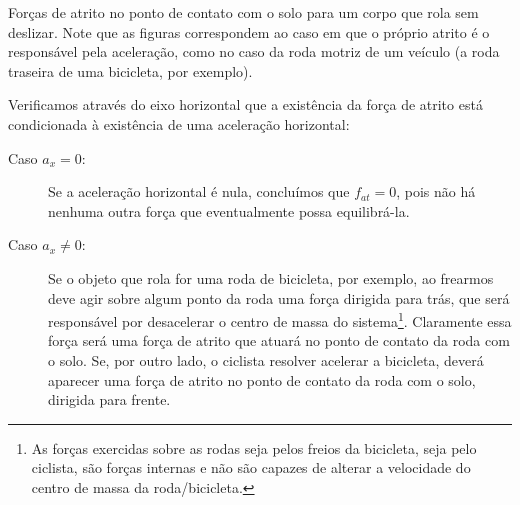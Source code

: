 \begin{marginfigure}[-3cm]
\caption{Forças de atrito no ponto de contato com o solo para um corpo que rola sem deslizar. Note que as figuras correspondem ao caso em que o próprio atrito é o responsável pela aceleração, como no caso da roda motriz de um veículo (a roda traseira de uma bicicleta, por exemplo).}
\end{marginfigure}

Verificamos através do eixo horizontal que a existência da força de atrito está condicionada à existência de uma aceleração horizontal:
\begin{description}
    \item[Caso $a_x = 0$:] Se a aceleração horizontal é nula, concluímos que $f_{at} = 0$, pois não há nenhuma outra força que eventualmente possa equilibrá-la.
    \item[Caso $a_x \neq 0$:] Se o objeto que rola for uma roda de bicicleta, por exemplo, ao frearmos deve agir sobre algum ponto da roda uma força dirigida para trás, que será responsável por desacelerar o centro de massa do sistema\footnote{As forças exercidas sobre as rodas seja pelos freios da bicicleta, seja pelo ciclista, são forças internas e não são capazes de alterar a velocidade do centro de massa da roda/bicicleta.}. Claramente essa força será uma força de atrito que atuará no ponto de contato da roda com o solo. Se, por outro lado, o ciclista resolver acelerar a bicicleta, deverá aparecer uma força de atrito no ponto de contato da roda com o solo, dirigida para frente.
\end{description}

